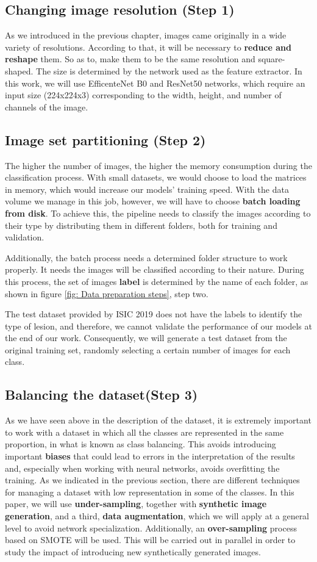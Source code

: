 \subsection{{Changing image resolution (Step 1)}}
As we introduced in the previous chapter, images came originally in a wide variety of resolutions. According to that, it will be necessary to \textbf{reduce and reshape} them. So as to, make them to be the same resolution and square-shaped. The size is determined by the network used as the feature extractor. In this work, we will use EfficenteNet B0 and ResNet50 networks, which require an input size (224x224x3) corresponding to the width, height, and number of channels of the image.

\subsection{{Image set partitioning (Step 2)}}
The higher the number of images, the higher the memory consumption during the classification process. With small datasets, we would choose to load the matrices in memory, which would increase our models' training speed. With the data volume we manage in this job, however, we will have to choose \textbf{batch loading from disk}. To achieve this, the pipeline needs to classify the images according to their type by distributing them in different folders, both for training and validation.

Additionally, the batch process needs a determined folder structure to work properly. It needs the images will be classified according to their nature. During this process, the set of images \textbf{label} is determined by the name of each folder, as shown in figure \ref{fig: Data preparation steps}, step two.

The test dataset provided by ISIC 2019 does not have the labels to identify the type of lesion, and therefore, we cannot validate the performance of our models at the end of our work. Consequently, we will generate a test dataset from the original training set, randomly selecting a certain number of images for each class.


\subsection{{Balancing the dataset(Step 3)}}
As we have seen above in the description of the dataset, it is extremely important to work with a dataset in which all the classes are represented in the same proportion, in what is known as class balancing. This avoids introducing important \textbf{biases} that could lead to errors in the interpretation of the results and, especially when working with neural networks, avoids overfitting the training. As we indicated in the previous section, there are different techniques for managing a dataset with low representation in some of the classes. In this paper, we will use \textbf{under-sampling}, together with \textbf{synthetic image generation}, and a third, \textbf{data augmentation}, which we will apply at a general level to avoid network specialization. Additionally, an \textbf{over-sampling} process based on SMOTE will be used. This will be carried out in parallel in order to study the impact of introducing new synthetically generated images.

